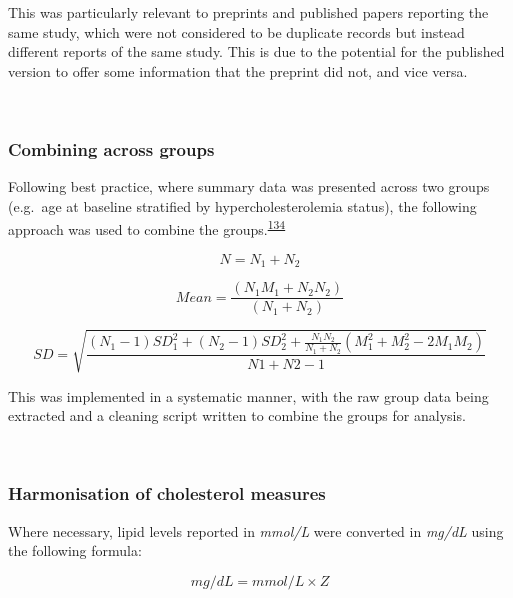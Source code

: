 \documentclass[a4paper, twoside]{templates/ociamthesis}
\begin{document}
This was particularly relevant to preprints and published papers reporting the same study, which were not considered to be duplicate records but instead different reports of the same study. This is due to the potential for the published version to offer some information that the preprint did not, and vice versa.

~

\hypertarget{combining-across-groups}{%
\subsubsection{Combining across groups}\label{combining-across-groups}}

Following best practice, where summary data was presented across two groups (e.g.~age at baseline stratified by hypercholesterolemia status), the following approach was used to combine the groups.\textsuperscript{\protect\hyperlink{ref-higgins2019}{134}}

\begin{equation}
N = N_1 + N_2
  \label{eq:combiningGroups1}
\end{equation}

\begin{equation}
Mean = \frac{(N_1M_1 + N_2N_2)}{(N_1 + N_2)}
  \label{eq:combiningGroups2}
\end{equation}

\begin{equation}
SD = \sqrt{\frac{(N_1-1)SD_1^2 + (N_2-1)SD_2^2 + \frac{N_1N_2}{N_1 + N_2}(M_1^2 + M_2^2 - 2M_1M_2)}{N1 + N2 -1}}
  \label{eq:combiningGroups3}
\end{equation}

This was implemented in a systematic manner, with the raw group data being extracted and a cleaning script written to combine the groups for analysis.

~

\hypertarget{harmonisation-of-cholesterol-measures}{%
\subsubsection{Harmonisation of cholesterol measures}\label{harmonisation-of-cholesterol-measures}}

Where necessary, lipid levels reported in \emph{mmol/L} were converted in \emph{mg/dL} using the following formula:

\begin{equation} 
  mg/dL = mmol/L \times{} Z
  \label{eq:lipidConversion}
\end{equation}
\end{document}
